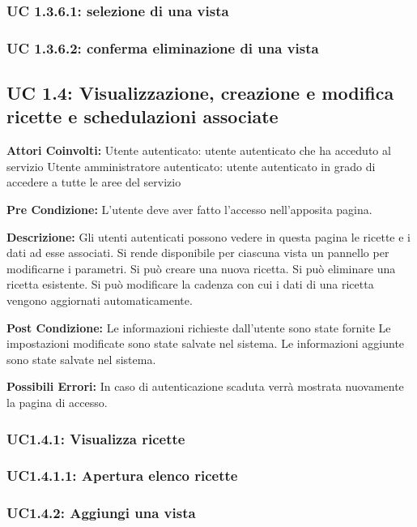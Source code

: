 \subsubsection{UC 1.3.6.1: selezione di una vista}

\subsubsection{UC 1.3.6.2: conferma eliminazione di una vista}

\subsection{UC 1.4: Visualizzazione, creazione e modifica ricette e schedulazioni associate}

\textbf{Attori Coinvolti:}
Utente autenticato: utente autenticato che ha acceduto al servizio
Utente amministratore autenticato: utente autenticato in grado di accedere a tutte le aree del servizio

\textbf{Pre Condizione:}
        L’utente deve aver fatto l’accesso nell’apposita pagina.

\textbf{Descrizione:}
        Gli utenti autenticati possono vedere in questa pagina le ricette e i dati ad esse associati. 
Si rende disponibile per ciascuna vista un pannello per modificarne i parametri. 
Si può creare una nuova ricetta. 
Si può eliminare una ricetta esistente.
Si può modificare la cadenza con cui i dati di una ricetta vengono aggiornati automaticamente.

\textbf{Post Condizione:}
        Le informazioni richieste dall’utente sono state fornite
Le impostazioni modificate sono state salvate nel sistema.
Le informazioni aggiunte sono state salvate nel sistema.

\textbf{Possibili Errori:}
    In caso di autenticazione scaduta verrà mostrata nuovamente la pagina di accesso.

\subsubsection{UC1.4.1: Visualizza ricette}
\subsubsection{UC1.4.1.1: Apertura elenco ricette}
\subsubsection{UC1.4.2: Aggiungi una vista}
